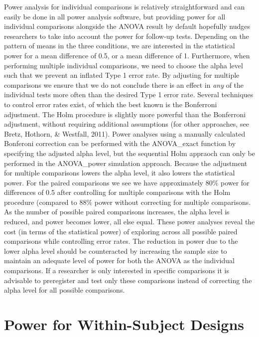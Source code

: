 \documentclass[
  ,man,floatsintext]{apa6}
\begin{document}
Power analysis for individual comparisons is relatively straightforward and can easily be done in all power analysis software, but providing power for all individual comparisons alongside the ANOVA result by default hopefully nudges researchers to take into account the power for follow-up tests.
Depending on the pattern of means in the three conditions, we are interested in the statistical power for a mean difference of 0.5, or a mean difference of 1.
Furthermore, when performing multiple individual comparisons, we need to choose the alpha level such that we prevent an inflated Type 1 error rate.
By adjusting for multiple comparisons we ensure that we do not conclude there is an effect in \emph{any} of the individual tests more often than the desired Type 1 error rate.
Several techniques to control error rates exist, of which the best known is the Bonferroni adjustment.
The Holm procedure is slightly more powerful than the Bonferroni adjustment, without requiring additional assumptions (for other approaches, see Bretz, Hothorn, \& Westfall, 2011).
Power analyses using a manually calculated Bonferoni correction can be performed with the ANOVA\_exact function by specifying the adjusted alpha level, but the sequential Holm appraoch can only be performed in the ANOVA\_power simulation approach.
Because the adjustment for multiple comparisons lowers the alpha level, it also lowers the statistical power.
For the paired comparisons we see we have approximately 80\% power for differences of 0.5 after controlling for multiple comparisons with the Holm procedure (compared to 88\% power without correcting for multiple comparisons.
As the number of possible paired comparisons increases, the alpha level is reduced, and power becomes lower, all else equal.
These power analyses reveal the cost (in terms of the statistical power) of exploring across all possible paired comparisons while controlling error rates.
The reduction in power due to the lower alpha level should be counteracted by increasing the sample size to maintain an adequate level of power for both the ANOVA as the individual comparisons.
If a researcher is only interested in specific comparisons it is advisable to preregister and test only these comparisons instead of correcting the alpha level for all possible comparisons.

\hypertarget{power-for-within-subject-designs}{%
\section{Power for Within-Subject Designs}\label{power-for-within-subject-designs}}
\end{document}
